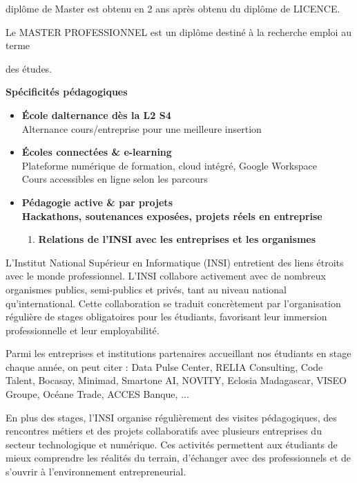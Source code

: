 diplôme de Master est obtenu en 2 ans après obtenu du diplôme de
LICENCE.

Le MASTER PROFESSIONNEL est un diplôme destiné à la recherche emploi au
terme

des études.

\textbf{Spécificités pédagogiques}

\begin{itemize}
	\item
	\textbf{École d\textquotesingle alternance dès la L2 S4}\\
	Alternance cours/entreprise pour une meilleure insertion
	\item
	\textbf{Écoles connectées \& e-learning}\\
	Plateforme numérique de formation, cloud intégré, Google Workspace\\
	Cours accessibles en ligne selon les parcours
	\item
	\textbf{Pédagogie active \& par projets\\
		Hackathons, soutenances exposées, projets réels en entreprise}
	
	\begin{enumerate}
		\def\labelenumi{\arabic{enumi}.}
		\item
		\textbf{Relations de l'INSI avec les entreprises et les organismes}
	\end{enumerate}
\end{itemize}

L'Institut National Supérieur en Informatique (INSI) entretient des
liens étroits avec le monde professionnel. L'INSI collabore activement
avec de nombreux organismes publics, semi-publics et privés, tant au
niveau national qu'international. Cette collaboration se traduit
concrètement par l'organisation régulière de stages obligatoires pour
les étudiants, favorisant leur immersion professionnelle et leur
employabilité.

Parmi les entreprises et institutions partenaires accueillant nos
étudiants en stage chaque année, on peut citer : Data Pulse Center,
RELIA Consulting, Code Talent, Bocasay, Minimad, Smartone AI, NOVITY,
Eclosia Madagascar, VISEO Groupe, Océane Trade, ACCES Banque, ...

En plus des stages, l'INSI organise régulièrement des visites
	pédagogiques, des rencontres métiers et des projets
	collaboratifs avec plusieurs entreprises du secteur technologique et
numérique. Ces activités permettent aux étudiants de mieux comprendre
les réalités du terrain, d'échanger avec des professionnels et de
s'ouvrir à l'environnement entrepreneurial.

